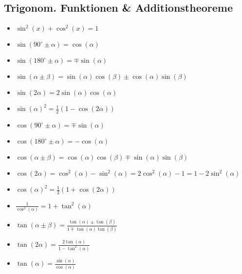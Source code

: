 \subsection{Trigonom. Funktionen \& Additionstheoreme}
\begin{itemize}[leftmargin=*]
	\item $\sin^2(x) + \cos^2(x) = 1$
	
	\item $\sin(90^\circ \pm \alpha) = \cos(\alpha)$
	\item $\sin(180^\circ \pm \alpha) = \mp \sin(\alpha)$
	\item $\sin(\alpha \pm \beta) = \sin(\alpha)\cos(\beta) \pm	\cos(\alpha)\sin(\beta)$
	\item $\sin(2\alpha) = 2 \sin(\alpha)\cos(\alpha)$
	\item $\sin(\alpha)^2 = \frac{1}{2} (1 - \cos(2\alpha))$

	\item $\cos(90^\circ \pm \alpha) = \mp \sin(\alpha)$
	\item $\cos(180^\circ \pm \alpha) = - \cos(\alpha)$
	\item $\cos(\alpha \pm \beta) = \cos(\alpha)\cos(\beta) \mp \sin(\alpha) \sin(\beta)$
	\item $\cos(2\alpha) = \cos^2(\alpha) - \sin^2(\alpha) = 2 \cos^2(\alpha) - 1 = 1 - 2 \sin^2(\alpha)$
	\item $\cos(\alpha)^2 = \frac{1}{2} (1 + \cos(2\alpha))$
	\item $\frac{1}{\cos^2(\alpha)} = 1 + \tan^2(\alpha)$

	\item $\tan(\alpha \pm \beta) = \frac{\tan(\alpha) \pm \tan(\beta)}{1 \mp \tan(\alpha)\tan(\beta)}$
	\item $\tan(2\alpha) = \frac{2 \tan(\alpha)}{1 - \tan^2(\alpha)}$
	\item $\tan(\alpha) = \frac{\sin(\alpha)}{\cos{(\alpha)}}$
\end{itemize}

